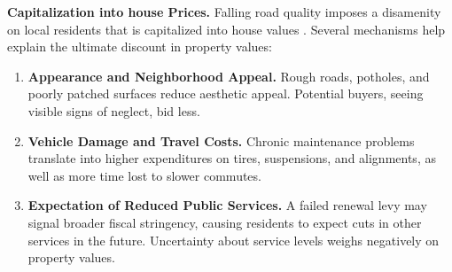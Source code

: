 {\bf Capitalization into house Prices.} Falling road quality imposes a disamenity on local residents that is capitalized into house values \cite{Oates1969}. Several mechanisms help explain the ultimate discount in property values:

\begin{enumerate}
    \item \textbf{Appearance and Neighborhood Appeal.} Rough roads, potholes, and poorly patched surfaces reduce aesthetic appeal. Potential buyers, seeing visible signs of neglect, bid less.
    \item \textbf{Vehicle Damage and Travel Costs.} Chronic maintenance problems translate into higher expenditures on tires, suspensions, and alignments, as well as more time lost to slower commutes.
    \item \textbf{Expectation of Reduced Public Services.} A failed renewal levy may signal broader fiscal stringency, causing residents to expect cuts in other services in the future. Uncertainty about service levels weighs negatively on property values. 
\end{enumerate}


